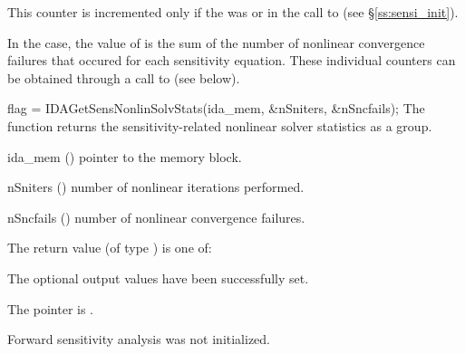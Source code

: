 {
  This counter is incremented only if the  was  or 
   in the call to  (see \S\ref{ss:sensi_init}).
  
  In the  case, the value of  is the sum of 
  the number of nonlinear convergence failures that occured for each sensitivity equation.
  These individual counters can be obtained through a call to
   (see below).
}
{
  flag = IDAGetSensNonlinSolvStats(ida\_mem, \&nSniters, \&nSncfails);
}
{
  The function  returns the sensitivity-related
  nonlinear solver statistics as a group.
}
{
  \begin{args}
  \item[ida\_mem] ()
    pointer to the {\idas} memory block.
  \item[nSniters] ()
    number of nonlinear iterations performed.
  \item[nSncfails] ()
    number of nonlinear convergence failures.
  \end{args}
}
{
  The return value  (of type ) is one of:
  \begin{args}
  \item[\Id{IDA\_SUCCESS}] 
    The optional output values have been successfully set.
  \item[\Id{IDA\_MEM\_NULL}]
    The  pointer is .
  \item[\Id{IDA\_NO\_SENS}]
    Forward sensitivity analysis was not initialized.
  \end{args}
}
{}
